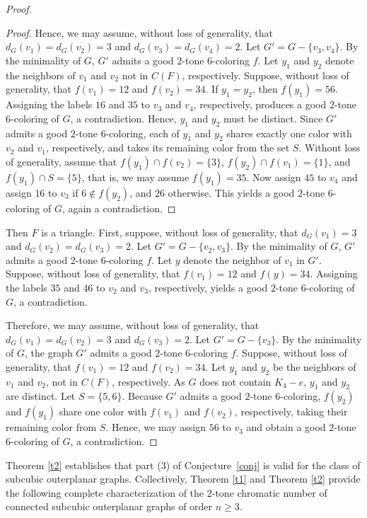\documentclass[12pt]{article}
\numberwithin{theorem}{section}
\numberwithin{conjecture}{section}
\numberwithin{corollary}{section}
\numberwithin{example}{section}
\numberwithin{lemma}{section}
\numberwithin{proposition}{section}
\numberwithin{problem}{section}
\numberwithin{remark}{section}
\numberwithin{claim}{theorem}
\numberwithin{definition}{section}
\begin{document}
\begin{proof}
\begin{proof}
 \noindent Hence, we may assume, without loss of generality, that $d_G(v_1)=d_G(v_2)=3$ and $d_G(v_3)=d_G(v_4)=2$. Let $G' = G - \{v_3,v_4\}$. By the minimality of $G$, $G'$ admits a good $2$-tone $6$-coloring $f$. Let $y_1$ and $y_2$ denote the neighbors of $v_1$ and $v_2$ not in $C(F)$, respectively. Suppose, without loss of generality, that $f(v_1)=12$ and $f(v_2)=34$. If $y_1 = y_2$, then $f(y_1)=56$. Assigning the labels $16$ and $35$ to $v_3$ and $v_4$, respectively, produces a good $2$-tone $6$-coloring of $G$, a contradiction. Hence, $y_1$ and $y_2$ must be distinct. Since $G'$ admits a good $2$-tone $6$-coloring, each of $y_1$ and $y_2$ shares exactly one color with $v_2$ and $v_1$, respectively, and takes its remaining color from the set $S$. Without loss of generality, assume that $f(y_1)\cap f(v_2) = \{3\}$, $f(y_2)\cap f(v_1) = \{1\}$, and $f(y_1)\cap S = \{5\}$, that is, we may assume $f(y_1)=35$. Now assign $45$ to $v_4$ and assign $16$ to $v_3$ if $6\notin f(y_2)$, and $26$ otherwise. This yields a good $2$-tone $6$-coloring of $G$, again a contradiction.\end{proof}

\noindent Then $F$ is a triangle. First, suppose, without loss of generality, that $d_G(v_1)=3$ and $d_G(v_2)=d_G(v_3)=2$. Let $G' = G - \{v_2, v_3\}$. By the minimality of $G$, $G'$ admits a good $2$-tone $6$-coloring $f$. Let $y$ denote the neighbor of $v_1$ in $G'$. Suppose, without loss of generality, that $f(v_1)=12$ and $f(y)=34$. Assigning the labels $35$ and $46$ to $v_2$ and $v_3$, respectively, yields a good $2$-tone $6$-coloring of $G$, a contradiction.

\noindent Therefore, we may assume, without loss of generality, that $d_G(v_1)=d_G(v_2)=3$ and $d_G(v_3)=2$. Let $G' = G - \{v_3\}$. By the minimality of $G$, the graph $G'$ admits a good $2$-tone $6$-coloring $f$. Suppose, without loss of generality, that $f(v_1)=12$ and $f(v_2)=34$. Let $y_1$ and $y_2$ be the neighbors of $v_1$ and $v_2$, not in $C(F)$, respectively. As $G$ does not contain $K_4-e$, $y_1$ and $y_2$ are distinct. Let $S=\{5,6\}$. Because $G'$ admits a good $2$-tone $6$-coloring, $f(y_2)$ and $f(y_1)$ share one color with $f(v_1)$ and $f(v_2)$, respectively, taking their remaining color from $S$. Hence, we may assign $56$ to $v_3$ and obtain a good $2$-tone $6$-coloring of $G$, a contradiction.\end{proof}

\noindent Theorem \ref{t2} establishes that part (3) of Conjecture~\ref{conj} is valid for the class of subcubic outerplanar graphs. Collectively, Theorem \ref{t1} and Theorem \ref{t2} provide the following complete characterization of the $2$-tone chromatic number of connected subcubic outerplanar graphs of order $n \ge 3$.
\end{document}
